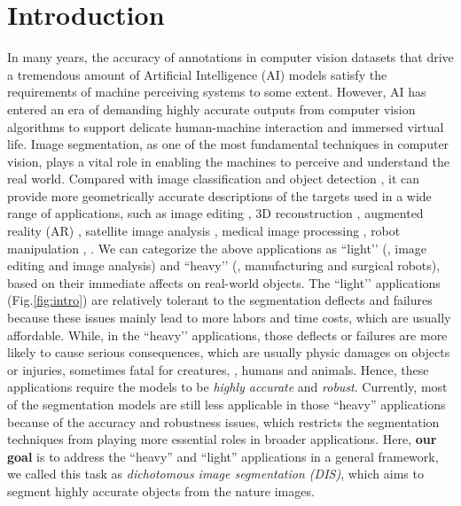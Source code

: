 \documentclass[10pt,twocolumn,letterpaper]{article}
\newcommand{\figref}[1]{Fig.\ref{#1}}
\begin{document}
\section{Introduction}
In many years, the accuracy of annotations in computer vision datasets that drive a tremendous amount of Artificial Intelligence (AI) models satisfy the requirements of machine perceiving systems to some extent. However, AI has entered an era of demanding highly accurate outputs from computer vision algorithms to support delicate human-machine interaction and immersed virtual life.
Image segmentation, as one of the most fundamental techniques in computer vision, plays a vital role in enabling the machines to perceive and understand the real world. Compared with image classification \cite{imagenet_cvpr09,DBLP:conf/nips/KrizhevskySH12,simonyan2014very} and object detection \cite{DBLP:conf/cvpr/GirshickDDM14,girshick2015fast,ren2015faster}, it can provide more geometrically accurate descriptions of the targets used in a wide range of applications, such as image editing \cite{goferman2012context}, 3D reconstruction \cite{Liu_2021_CVPR}, augmented reality (AR) \cite{qin2021boundary}, satellite image analysis \cite{DBLP:journals/remotesensing/WeiLLZCJZY21}, medical image processing \cite{ronneberger2015u}, robot manipulation \cite{DBLP:conf/rss/Chen0LH21}, \etc. 
We can categorize the above applications as ``light’’ (\eg, image editing and image analysis) and ``heavy’’ (\eg, manufacturing and surgical robots), based on their immediate affects on real-world objects. 
The ``light’’ applications (\figref{fig:intro}) are relatively tolerant to the segmentation deflects and failures because these issues mainly lead to more labors and time costs, which are usually affordable.
While, in the ``heavy’’ applications, those deflects or failures are more likely to cause serious consequences, which are usually physic damages on objects or injuries, sometimes fatal for creatures, \eg, humans and animals. Hence, these applications require the models to be \textit{highly accurate} and \textit{robust}. 
Currently, most of the segmentation models are still less applicable in those ``heavy'' applications because of the accuracy and robustness issues, which restricts the segmentation techniques from playing more essential roles in broader applications. 
Here, \textbf{our goal} is to address the ``heavy'' and ``light'' applications in a general framework, we called this task as \textit{dichotomous image segmentation (DIS)}, which aims to segment highly accurate objects from the nature images.
\end{document}
